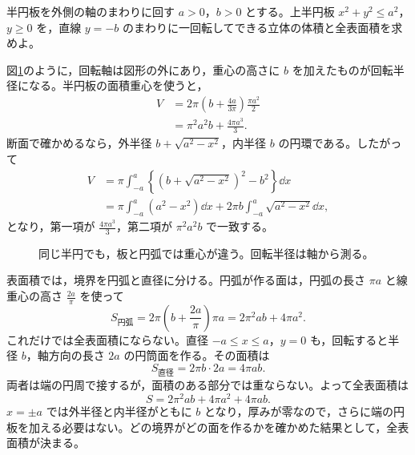 \begin{example}{半円板を外側の軸のまわりに回す}
$a>0$，$b>0$ とする。上半円板 $x^2+y^2\leq a^2$，$y\geq0$ を，直線 $y=-b$ のまわりに一回転してできる立体の体積と全表面積を求めよ。
\end{example}

図\ref{図:半円の二つの重心}のように，回転軸は図形の外にあり，重心の高さに $b$ を加えたものが回転半径になる。半円板の面積重心を使うと，
\[
\begin{aligned}
V&=2\pi\left(b+\frac{4a}{3\pi}\right)\frac{\pi a^2}{2}\\
 &=\pi^2a^2b+\frac{4\pi a^3}{3}.
\end{aligned}
\]
断面で確かめるなら，外半径 $b+\sqrt{a^2-x^2}$，内半径 $b$ の円環である。したがって
\[
\begin{aligned}
V&=\pi\int_{-a}^a
\left\{\left(b+\sqrt{a^2-x^2}\right)^2-b^2\right\}\dd x\\
 &=\pi\int_{-a}^a(a^2-x^2)\dd x
  +2\pi b\int_{-a}^a\sqrt{a^2-x^2}\dd x,
\end{aligned}
\]
となり，第一項が $\frac{4\pi a^3}{3}$，第二項が $\pi^2a^2b$ で一致する。

\begin{figure}[htbp]
\centering
{}
\caption{同じ半円でも，板と円弧では重心が違う。回転半径は軸から測る。}\label{図:半円の二つの重心}
\end{figure}

表面積では，境界を円弧と直径に分ける。円弧が作る面は，円弧の長さ $\pi a$ と線重心の高さ $\frac{2a}{\pi}$ を使って
\[
S_{\mathrm{円弧}}
 =2\pi\left(b+\frac{2a}{\pi}\right)\pi a
 =2\pi^2ab+4\pi a^2.
\]
これだけでは全表面積にならない。直径 $-a\leq x\leq a$，$y=0$ も，回転すると半径 $b$，軸方向の長さ $2a$ の円筒面を作る。その面積は
\[
S_{\mathrm{直径}}=2\pi b\cdot2a=4\pi ab.
\]
両者は端の円周で接するが，面積のある部分では重ならない。よって全表面積は
\[
S=2\pi^2ab+4\pi a^2+4\pi ab.
\]
$x=\pm a$ では外半径と内半径がともに $b$ となり，厚みが零なので，さらに端の円板を加える必要はない。どの境界がどの面を作るかを確かめた結果として，全表面積が決まる。

